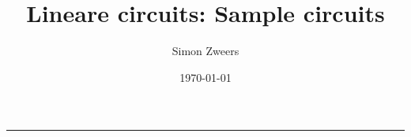 \documentclass[12pt,table]{article}
\newcommand{\thecourse}{Lineare circuits}
\begin{document}
\title{
     \\[2em]
    \thecourse: Sample circuits
}
\author{Simon Zweers}
\date{\today}
\maketitle
\thispagestyle{fancy}
\vspace{1em}
\hrule
\vspace{1em}

\newpage

\setcounter{secnumdepth}{0}
\tableofcontents
\newpage





\end{document}
